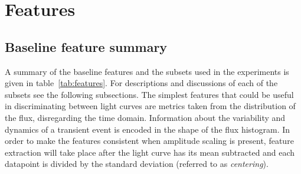 	
	\section{Features}
	\label{sec:features}
	\subsection{Baseline feature summary}
	A summary of the baseline features and the subsets used in the experiments is given in table~\ref{tab:features}. For descriptions and discussions of each of the subsets see the following subsections. 
	The simplest features that could be useful in discriminating between light curves are metrics taken from the distribution of the flux, disregarding the time domain. Information about the variability and dynamics of a transient event is encoded in the shape of the flux histogram. In order to make the features consistent when amplitude scaling is present, feature extraction will take place after the light curve has its mean subtracted and each datapoint is divided by the standard deviation (referred to as \emph{centering}).
	
